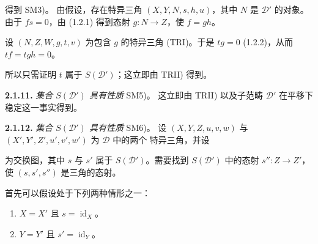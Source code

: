 \clearpage
{}%
\begingroup
\small
\setlength{\emergencystretch}{1.5em}%
\setlength{\abovedisplayskip}{2pt plus 1pt minus 1pt}%
\setlength{\belowdisplayskip}{2pt plus 1pt minus 1pt}%

\noindent 得到 SM3)。
%
由假设，存在特异三角 $(X,Y,N,s,h,u)$，其中 $N$ 是 $\mathcal D'$ 的对象。
由于 $fs=0$，由 (1.2.1) 得到态射 $g\colon N\to Z$，使 $f=gh$。

设 $(N,Z,W,g,t,v)$ 为包含 $g$ 的特异三角 (TRI)。于是 $tg=0$
(1.2.2)，从而 $tf=tgh=0$。

所以只需证明 $t$ 属于 $S(\mathcal D')$；这立即由 TRII) 得到。

\medskip
\noindent\textbf{2.1.11.}\quad
{}
\emph{集合 $S(\mathcal D')$ 具有性质} SM5)。
这立即由 TRII) 以及子范畴 $\mathcal D'$ 在平移下稳定这一事实得到。

\medskip
\noindent\textbf{2.1.12.}\quad
{}
\emph{集合 $S(\mathcal D')$ 具有性质} SM6)。
设 $(X,Y,Z,u,v,w)$ 与 $(X',Y',Z',u',v',w')$ 为 $\mathcal D$ 中的两个
特异三角，并设

\begin{center}
\end{center}

\noindent 为交换图，其中 $s$ 与 $s'$ 属于 $S(\mathcal D')$。需要找到
$S(\mathcal D')$ 中的态射 $s''\colon Z\to Z'$，使 $(s,s',s'')$ 是三角的态射。

首先可以假设处于下列两种情形之一：

\begin{enumerate}
\renewcommand{\labelenumi}{\emph{\alph{enumi})}}
  \item {}%
  $X=X'$ 且 $s=\operatorname{id}_X$。
  \item {}%
  $Y=Y'$ 且 $s'=\operatorname{id}_Y$。
\end{enumerate}

